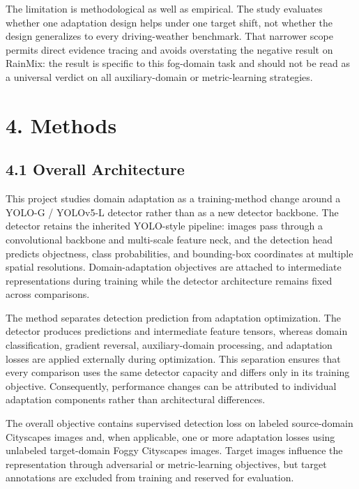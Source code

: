\documentclass[
  11pt,
]{article}
\begin{document}
The limitation is methodological as well as empirical. The study
evaluates whether one adaptation design helps under one target shift,
not whether the design generalizes to every driving-weather benchmark.
That narrower scope permits direct evidence tracing and avoids
overstating the negative result on RainMix: the result is specific to
this fog-domain task and should not be read as a universal verdict on
all auxiliary-domain or metric-learning strategies.

\hypertarget{methods}{%
\section{4. Methods}\label{methods}}

\hypertarget{overall-architecture}{%
\subsection{4.1 Overall Architecture}\label{overall-architecture}}

This project studies domain adaptation as a training-method change
around a YOLO-G / YOLOv5-L detector rather than as a new detector
backbone. The detector retains the inherited YOLO-style pipeline: images
pass through a convolutional backbone and multi-scale feature neck, and
the detection head predicts objectness, class probabilities, and
bounding-box coordinates at multiple spatial resolutions.
Domain-adaptation objectives are attached to intermediate
representations during training while the detector architecture remains
fixed across comparisons.

The method separates detection prediction from adaptation optimization.
The detector produces predictions and intermediate feature tensors,
whereas domain classification, gradient reversal, auxiliary-domain
processing, and adaptation losses are applied externally during
optimization. This separation ensures that every comparison uses the
same detector capacity and differs only in its training objective.
Consequently, performance changes can be attributed to individual
adaptation components rather than architectural differences.

The overall objective contains supervised detection loss on labeled
source-domain Cityscapes images and, when applicable, one or more
adaptation losses using unlabeled target-domain Foggy Cityscapes images.
Target images influence the representation through adversarial or
metric-learning objectives, but target annotations are excluded from
training and reserved for evaluation.
\end{document}
